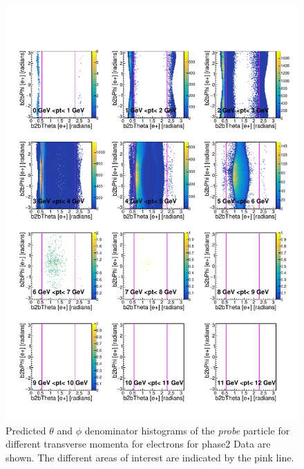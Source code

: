 \documentclass[a4paper,11pt,twosided,final,german,openbib,pdftex,listof=totoc,bibliography=totoc]{scrbook}
\begin{document}
\begin{appendix}
\begin{figure}[h!]
	\includegraphics[width=\textwidth]{Plots/RTPtMemD_Data.pdf}
	\caption[Denominator $\theta$, $\phi$ Electron Transverse Momentum Data]{Predicted $\theta$ and $\phi$ denominator histograms of the \textit{probe} particle for different transverse momenta for electrons for phase2 Data are shown. The different areas of interest are indicated by the pink line.}
	\label{plt:RTPtMemD_Data}
\end{figure}






\end{appendix}
\end{document}

